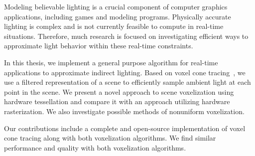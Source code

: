 Modeling believable lighting is a crucial component of computer graphics applications, including games and modeling programs. Physically accurate lighting is complex and is not currently feasible to compute in real-time situations. Therefore, much research is focused on investigating efficient ways to approximate light behavior within these real-time constraints.

In this thesis, we implement a general purpose algorithm for real-time applications to approximate indirect lighting. Based on voxel cone tracing~\cite{crassin2011interactive}, we use a filtered representation of a scene to efficiently sample ambient light at each point in the scene. We present a novel approach to scene voxelization using hardware tessellation and compare it with an approach utilizing hardware rasterization. We also investigate possible methods of nonuniform voxelization.

Our contributions include a complete and open-source implementation of voxel cone tracing along with both voxelization algorithms. We find similar performance and quality with both voxelization algorithms.


